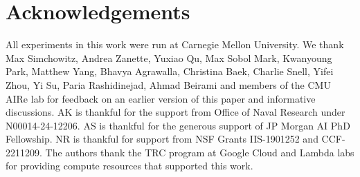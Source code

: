 \vspace{-0.2cm}
\section*{Acknowledgements}
\vspace{-0.1cm}
All experiments in this work were run at Carnegie Mellon University.
We thank Max Simchowitz, Andrea Zanette, Yuxiao Qu, Max Sobol Mark, Kwanyoung Park, Matthew Yang, Bhavya Agrawalla, Christina Baek, Charlie Snell, Yifei Zhou, Yi Su, Paria Rashidinejad, Ahmad Beirami and members of the CMU AIRe lab for feedback on an earlier version of this paper and informative discussions. AK is thankful for the  support from Office of Naval Research under N00014-24-12206. AS is thankful for the generous support of JP Morgan AI PhD Fellowship. NR is thankful for support from NSF Grants IIS-1901252 and CCF-2211209. The authors thank the TRC program at Google Cloud and Lambda labs for providing compute resources that supported this work.












